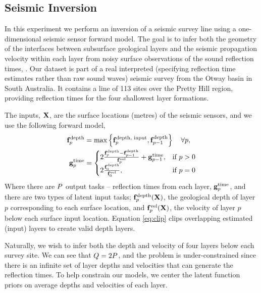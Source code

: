 \subsection{Seismic Inversion}

In this experiment we perform an inversion of a seismic survey line using a
one-dimensional seismic sensor forward model. The goal is to infer both the
geometry of the interfaces between subsurface geological layers and the
seismic propagation velocity within each layer from noisy surface observations
of the sound reflection times, \Outs. 
Our dataset is part of a real interpreted (specifying reflection time
estimates rather than raw sound waves) seismic survey from the Otway basin in
South Australia.  It contains a line of 113 sites over the Pretty Hill region,
providing reflection times for the four shallowest layer formations.

The inputs, $\mathbf{X}$, are the surface locations (metres) of the seismic sensors,
and we use the following forward model,
\begin{align}
    \mathbf{f}_p^\text{depth} &= \max\left\{{\mathbf{f}_p^\text{depth, input},
        \mathbf{f}_{p-1}^\text{depth}}\right\} \quad \forall p, \label{eq:clip} \\
    \mathbf{g}_p^\text{time} &=
    \begin{cases}
        2\frac{\mathbf{f}_p^\text{depth} - \mathbf{f}_{p-1}^\text{depth}}
        {\mathbf{f}_p^\text{vel}} + \mathbf{g}_{p-1}^\text{time},
        & \text{if } p > 0 \\
        2\frac{\mathbf{f}_0^\text{depth}}{\mathbf{f}_0^\text{vel}},
        & \text{if } p = 0
    \end{cases}
\end{align}
Where there are $P$ output tasks -- reflection times from each layer,
$\mathbf{g}_p^\text{time}$, and there are two types of latent input tasks;
$\mathbf{f}_p^\text{depth}\!\left({\mathbf{X}}\right)$, the geological depth of layer $p$
corresponding to each surface location, and
$\mathbf{f}_p^\text{vel}\!\left({\mathbf{X}}\right)$, the velocity of layer $p$ below each
surface input location. Equation \eqref{eq:clip} clips overlapping estimated
(input) layers to create valid depth layers.

Naturally, we wish to infer both the depth and velocity of four layers below
each survey site. We can see that $Q = 2P$, and the problem is
under-constrained since there is an infinite set of layer depths and
velocities that can generate the reflection times. To help constrain our
models, we center the latent function priors on average depths and velocities
of each layer.

